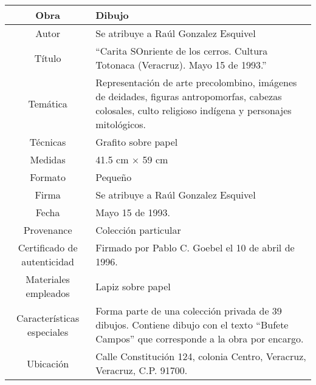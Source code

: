 \documentclass[10pt,letter]{report}
\begin{document}
\begin{table}[H]
\centering
\begin{tabular}{|c|m{}|}
\hline
Obra& Dibujo	\\
\hline
Autor & Se atribuye a Ra\'ul Gonzalez Esquivel\\
\hline
T\'itulo &``Carita SOnriente de los cerros. Cultura Totonaca (Veracruz). Mayo 15 de 1993.'' \\
\hline
Tem\'atica & Representaci\'on de arte precolombino, im\'agenes de deidades, figuras antropomorfas, cabezas colosales, culto religioso ind\'igena y personajes mitol\'ogicos.\\
\hline
T\'ecnicas &Grafito sobre papel \\
\hline
Medidas & 41.5 cm $\times$ 59 cm \\
\hline
 Formato & Peque\~no \\
 \hline
 Firma & Se atribuye a Ra\'ul Gonzalez Esquivel\\ 
 \hline
  Fecha & Mayo 15 de 1993.\\
 \hline
 Provenance & Colecci\'on particular\\
 \hline
 Certificado de autenticidad& Firmado por Pablo C. Goebel el 10 de abril de 1996.  \\
 \hline 
  Materiales empleados & Lapiz sobre papel\\
 \hline
 Caracter\'isticas especiales & Forma parte de una colecci\'on privada de 39 dibujos. 
Contiene dibujo con el texto ``Bufete Campos'' que corresponde a la obra por encargo. \\
\hline 
Ubicaci\'on & Calle Constituci\'on 124, colonia Centro, Veracruz, Veracruz, C.P. 91700.\\
\hline

\end{tabular}
\end{table}
\end{document}
